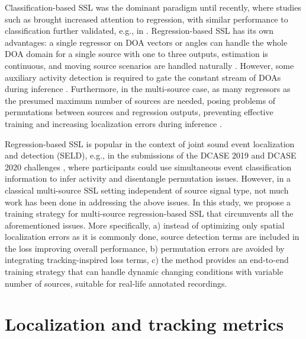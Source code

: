 \documentclass[conference]{IEEEtran}
\begin{document}
    Classification-based SSL was the dominant paradigm until recently, where studies such as \cite{adavanne2018sound} brought increased attention to regression, with similar performance to classification further validated, e.g., in \cite{perotin2019regression}. Regression-based SSL has its own advantages: a single regressor on DOA vectors or angles can handle the whole DOA domain for a single source with one to three outputs, estimation is continuous, and moving source scenarios are handled naturally \cite{adavanne2019localization, adavanneThesis}. However, some auxiliary activity detection is required to gate the constant stream of DOAs during inference \cite{diaz2020robust}. Furthermore, in the multi-source case, as many regressors as the presumed maximum number of sources are needed, posing problems of permutations between sources and regression outputs, preventing effective training and increasing localization errors during inference \cite{Cao2020}.
    
    Regression-based SSL is popular in the context of joint sound event localization and detection (SELD), e.g., in the submissions of the DCASE 2019 and DCASE 2020 challenges \cite{politis2020overview}, where participants could use simultaneous event classification information to infer activity and disentangle permutation issues. 
    However, in a classical multi-source SSL setting independent of source signal type, not much work has been done in addressing the above issues.
    In this study, we propose a training strategy for multi-source regression-based SSL that circumvents all the aforementioned issues. More specifically, a) instead of optimizing only spatial localization errors as it is commonly done, source detection terms are included in the loss improving overall performance, b) permutation errors are avoided by integrating tracking-inspired loss terms, c) the method provides an end-to-end training strategy that can handle dynamic changing conditions with variable number of sources, suitable for real-life annotated recordings.


\section{Localization and tracking metrics}
\end{document}
